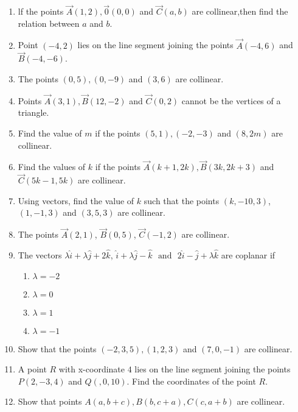 \begin{enumerate}[label=\thesubsection.\arabic*,ref=\thesubsection.\theenumi]
\item lf the points $\vec{A}(1,2),\vec{0}(0,0)$ and $\vec{C}(a,b)$ are collinear,then find the relation between $a$ and $b$.
	\item Point $ (-4,2)$ lies on the line segment joining the points $ \vec{A}(-4,6)$  and  $\vec{B}(-4,-6)$.
 \item The points $(0,5),(0,-9)$ and $(3,6)$ are collinear.
\item Points $\vec{A}(3,1), \vec{B}(12,-2)$  and  $\vec {C}(0,2)$ cannot be the vertices of a triangle.
\item Find the value of $m$ if the points $(5,1),(-2,-3)$  and $(8,2m)$ are collinear.
\item Find the values of $k$ if the points $\vec{A}(k+1,2k),\vec{B}(3k,2k+3)$ and $\vec{C}(5k-1,5k)$ are collinear.
\item Using vectors, find the value of $k$ such that the points $(k,-10,3)$, $(1,-1,3)$  and  $(3,5,3)$ are collinear.
\item The points $\vec{A}(2,1)$, $\vec{B}(0,5)$, $\vec{C}(-1,2)$ are collinear.
\item The vectors $\lambda\hat{i}+\lambda\hat{j}+2\hat{k}$, $\hat{i}+\lambda\hat{j}-\hat{k}$ $\text{ and }$ $2\hat{i}-\hat{j}+\lambda\hat{k}$ are coplanar if
	\begin{enumerate}
\item	$\lambda=-2$
\item $\lambda=0$
\item $\lambda=1$
\item	$\lambda=-1$
\end{enumerate}
\item Show that the points $(-2,3,5), (1,2,3)$ and $(7,0,-1)$ are collinear.
\item A point $R$ with x-coordinate $4$ lies on the line segment joining the points $P(2,-3,4)$ and $Q(,0,10)$. Find the coordinates of the point $R$.
\item Show that points $A(a, b+c), B(b, c+a), C(c, a+b)$ are collinear.
\end{enumerate}
